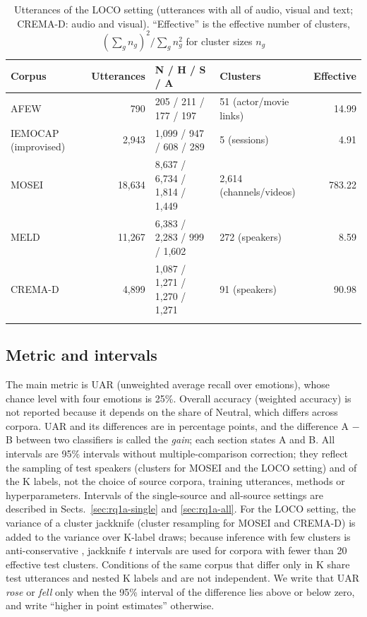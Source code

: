 \begin{table}[t]
\caption{Utterances of the LOCO setting (utterances with all of audio, visual and text; CREMA-D: audio and visual). ``Effective'' is the effective number of clusters, $(\sum_g n_g)^2/\sum_g n_g^2$ for cluster sizes $n_g$}\label{tab:loco}
\footnotesize\setlength{\tabcolsep}{4pt}
\begin{tabular}{@{}lrllr@{}}
\toprule
Corpus & Utterances & N / H / S / A & Clusters & Effective \\
\midrule
AFEW & 790 & 205 / 211 / 177 / 197 & 51 (actor/movie links) & 14.99 \\
IEMOCAP (improvised) & 2,943 & 1,099 / 947 / 608 / 289 & 5 (sessions) & 4.91 \\
MOSEI & 18,634 & 8,637 / 6,734 / 1,814 / 1,449 & 2,614 (channels/videos) & 783.22 \\
MELD & 11,267 & 6,383 / 2,283 / 999 / 1,602 & 272 (speakers) & 8.59 \\
CREMA-D & 4,899 & 1,087 / 1,271 / 1,270 / 1,271 & 91 (speakers) & 90.98 \\
\botrule
\end{tabular}
\end{table}

\subsection{Metric and intervals}
The main metric is UAR (unweighted average recall over emotions), whose chance level with four emotions is 25\%. Overall accuracy (weighted accuracy) is not reported because it depends on the share of Neutral, which differs across corpora. UAR and its differences are in percentage points, and the difference A $-$ B between two classifiers is called the \emph{gain}; each section states A and B. All intervals are 95\% intervals without multiple-comparison correction; they reflect the sampling of test speakers (clusters for MOSEI and the LOCO setting) and of the K labels, not the choice of source corpora, training utterances, methods or hyperparameters. Intervals of the single-source and all-source settings are described in Sects.~\ref{sec:rq1a-single} and \ref{sec:rq1a-all}. For the LOCO setting, the variance of a cluster jackknife (cluster resampling for MOSEI and CREMA-D) is added to the variance over K-label draws; because inference with few clusters is anti-conservative \cite{cameron2008}, jackknife $t$ intervals are used for corpora with fewer than 20 effective test clusters. Conditions of the same corpus that differ only in K share test utterances and nested K labels and are not independent. We write that UAR \emph{rose} or \emph{fell} only when the 95\% interval of the difference lies above or below zero, and write ``higher in point estimates'' otherwise.
